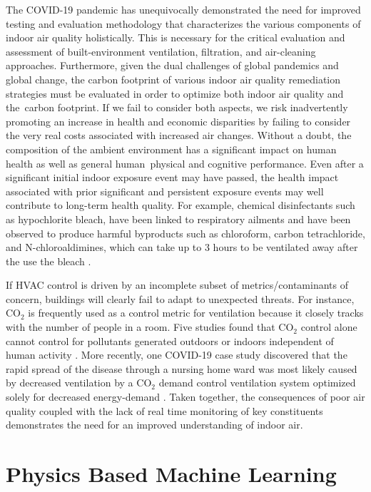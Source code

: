 The COVID-19 pandemic has unequivocally demonstrated the need for improved testing and evaluation methodology that characterizes the various components of indoor air quality holistically. This is necessary for the critical evaluation and assessment of built-environment ventilation, filtration, and air-cleaning approaches. Furthermore, given the dual challenges of global pandemics and global change, the carbon footprint of various indoor air quality remediation strategies must be evaluated in order to optimize both indoor air quality and the carbon footprint. If we fail to consider both aspects, we risk inadvertently promoting an increase in health and economic disparities by failing to consider the very real costs associated with increased air changes. Without a doubt, the composition of the ambient environment has a significant impact on human health as well as general human physical and cognitive performance. Even after a significant initial indoor exposure event may have passed, the health impact associated with prior significant and persistent exposure events may well contribute to long-term health quality. For example, chemical disinfectants such as hypochlorite bleach, have been linked to respiratory ailments and have been observed to produce harmful byproducts such as chloroform, carbon tetrachloride, and N-chloroaldimines, which can take up to 3 hours to be ventilated away after the use the bleach  \cite{finewax_quantification_2021, odabasi_halogenated_2008}.

If HVAC control is driven by an incomplete subset of metrics/contaminants of concern, buildings will clearly fail to adapt to unexpected threats. For instance, CO$_2$ is frequently used as a control metric for ventilation because it closely tracks with the number of people in a room. Five studies found that CO$_2$ control alone cannot control for pollutants generated outdoors or indoors independent of human activity \cite{zaatari_impact_2016}. More recently, one COVID-19 case study discovered that the rapid spread of the disease through a nursing home ward was most likely caused by decreased ventilation by a CO$_2$ demand control ventilation system optimized solely for decreased energy-demand \cite{lamping_air_nodate}. Taken together, the consequences of poor air quality coupled with the lack of real time monitoring of key constituents demonstrates the need for an improved understanding of indoor air.


\section{Physics Based Machine Learning}


